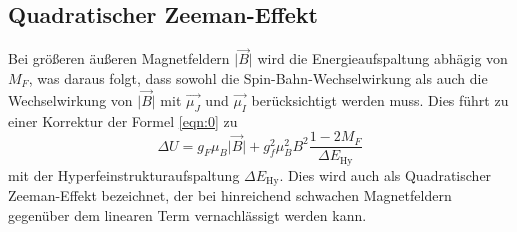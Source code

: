 \subsection{Quadratischer Zeeman-Effekt}
Bei größeren äußeren Magnetfeldern $\lvert \vec{B} \rvert$ wird die Energieaufspaltung abhägig von $M_F$, was daraus folgt, dass sowohl die Spin-Bahn-Wechselwirkung als auch die Wechselwirkung von $\lvert \vec{B} \rvert$ mit $\vec{ \mu_J}$ und $\vec{ \mu_I}$ berücksichtigt werden muss.
Dies führt zu einer Korrektur der Formel \eqref{eqn:0} zu
\begin{equation}
  \Delta U = g_F \mu_B \lvert \vec{B} \rvert + g_f^2 \mu_B ^2 B^2 \frac{1 - 2 M_F}{\Delta E_\text{Hy}}
\end{equation}
mit der Hyperfeinstrukturaufspaltung $\Delta E_\text{Hy}$.
Dies wird auch als Quadratischer Zeeman-Effekt bezeichnet, der bei hinreichend schwachen Magnetfeldern gegenüber dem linearen Term vernachlässigt werden kann.



